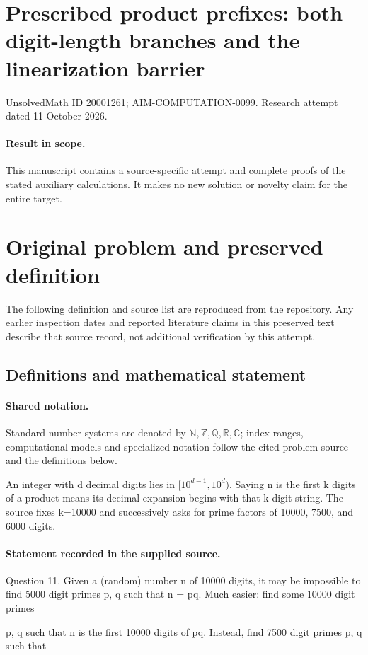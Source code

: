 \documentclass[11pt]{article}
\begin{document}
\section*{Prescribed product prefixes: both digit-length branches and the linearization barrier}
\noindent UnsolvedMath ID 20001261; AIM-COMPUTATION-0099. Research attempt dated 11 October 2026.
\paragraph{Result in scope.}This manuscript contains a source-specific attempt and complete proofs of the stated auxiliary calculations. It makes no new solution or novelty claim for the entire target.
\section{Original problem and preserved definition}
The following definition and source list are reproduced from the repository. Any earlier inspection dates and reported literature claims in this preserved text describe that source record, not additional verification by this attempt.
\subsection{Definitions and mathematical statement}

\paragraph{Shared notation.}Standard number systems are denoted by $\mathbb N,\mathbb Z,\mathbb Q,\mathbb R,\mathbb C$; index ranges, computational models and specialized notation follow the cited problem source and the definitions below.


An integer with d decimal digits lies in $[10^{d-1},10^d)$. Saying n is the first k digits of a product means its decimal expansion begins with that k-digit string. The source fixes k=10000 and successively asks for prime factors of 10000, 7500, and 6000 digits.
\paragraph{Statement recorded in the supplied source.}
Question 11. Given a (random) number n of 10000 digits, it may be impossible to find 5000 digit primes p, q such that n = pq. Much easier: find some 10000 digit primes

p, q such that n is the first 10000 digits of pq. Instead, find 7500 digit primes p, q such that
\end{document}
